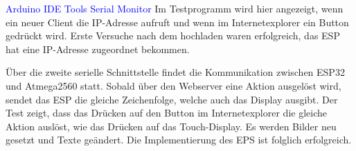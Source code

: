 \begin{enumerate}
\textcolor{blue}{Arduino IDE \textrightarrow Tools \textrightarrow Serial Monitor}\newline
Im Testprogramm wird hier angezeigt, wenn ein neuer Client die IP-Adresse aufruft und wenn im Internetexplorer ein Button gedrückt wird. Erste Versuche nach dem hochladen waren erfolgreich, das ESP hat eine IP-Adresse zugeordnet bekommen.
\end{enumerate}

Über die zweite serielle Schnittstelle findet die Kommunikation zwischen ESP32 und Atmega2560 statt. Sobald über den Webserver eine Aktion ausgelöst wird, sendet das ESP die gleiche Zeichenfolge, welche auch das Display ausgibt. Der Test zeigt, dass das Drücken auf den Button im Internetexplorer die gleiche Aktion auslöst, wie das Drücken auf das Touch-Display. Es werden Bilder neu gesetzt und Texte geändert. Die Implementierung des EPS ist folglich erfolgreich.
